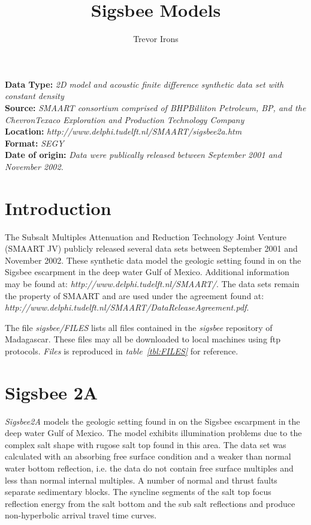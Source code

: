\title{Sigsbee Models}
\author{Trevor Irons}
\maketitle

\lstset{language=python,numbers=left,numberstyle=\tiny,showstringspaces=false}

\noindent
\textbf	{Data Type:} \emph{2D model and acoustic finite difference synthetic data set with constant density}\\
\textbf	{Source:} \emph{SMAART consortium comprised of BHPBilliton Petroleum, BP, and the ChevronTexaco Exploration and Production Technology Company}\\
\textbf {Location:} \emph{http://www.delphi.tudelft.nl/SMAART/sigsbee2a.htm}\\
\textbf	{Format:} \emph{SEGY} \\
\textbf{
	Date of origin:} \emph{Data were publically released between September 2001 and November 2002.}\\ 

\section{Introduction}
The Subsalt Multiples Attenuation and Reduction Technology Joint Venture (SMAART JV) publicly released several data sets between September 2001 and November 2002.  These synthetic data model the geologic setting found in on the Sigsbee escarpment in the deep water Gulf of Mexico.  Additional information may be found at: \emph{http://www.delphi.tudelft.nl/SMAART/}.  The data sets remain the property of SMAART and are used under the agreement found at: \emph{http://www.delphi.tudelft.nl/SMAART/DataReleaseAgreement.pdf}.  

The file \emph{sigsbee/FILES} lists all files contained in the \emph{sigsbee} repository of Madagascar.  These files may all be downloaded to local machines using ftp protocols.  \emph{Files} is reproduced in \emph{table~\ref{tbl:FILES}} for reference.  
{
\tiny

\normalsize
}

\section{Sigsbee 2A}
\emph{Sigsbee2A} models the geologic setting found in on the Sigsbee escarpment in the deep water Gulf of Mexico. The model exhibits illumination problems due to the complex salt shape with rugose salt top found in this area. The data set was calculated with an absorbing free surface condition and a weaker than normal water bottom reflection, i.e. the data do not contain free surface multiples and less than normal internal multiples.  A number of normal and thrust faults separate sedimentary blocks. The syncline segments of the salt top focus reflection energy from the salt bottom and the sub salt reflections and produce non-hyperbolic arrival travel time curves.

